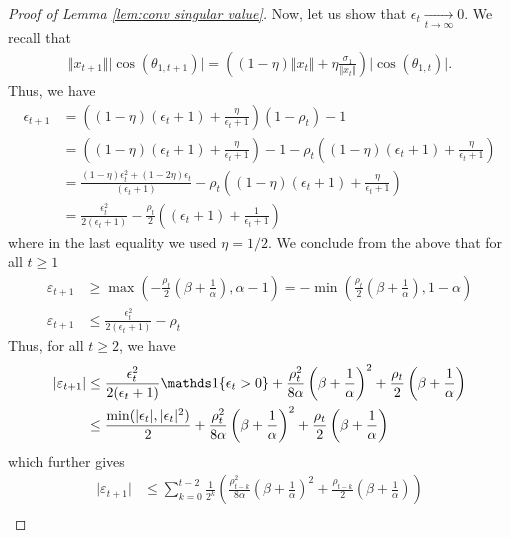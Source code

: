 \begin{proof}[Proof of Lemma \ref{lem:conv singular value}]
    \medskip 
    Now, let us show that $\epsilon_t \underset{t \to \infty}{\longrightarrow} 0$. We recall that  
    \begin{align}
        \Vert x_{t+1} \Vert \vert \cos(\theta_{1, t+1})\vert = \left((1-\eta)\Vert x_t \Vert + \eta \frac{\sigma_1}{\Vert x_t \Vert} \right) \vert \cos(\theta_{1, t})\vert.
    \end{align}
    Thus, we have 
    \begin{align}
        \epsilon_{t+1} & = \left( (1- \eta) (\epsilon_t + 1) + \frac{\eta}{\epsilon_t + 1}\right) (1 - \rho_t) - 1  \\
        & =  \left( (1- \eta) (\epsilon_t + 1) + \frac{\eta}{\epsilon_t + 1}\right) - 1 - \rho_t \left( (1- \eta) (\epsilon_t + 1) + \frac{\eta}{\epsilon_t + 1}\right) \\
        & = \frac{(1-\eta)\epsilon_t^2 + (1-2\eta)\epsilon_t }{(\epsilon_t + 1)} - \rho_t \left( (1- \eta) (\epsilon_t + 1) + \frac{\eta}{\epsilon_t + 1}\right) \\
        & = \frac{\epsilon_t^2}{2 (\epsilon_t + 1)} - \frac{\rho_t}{2} \left( (\epsilon_t + 1) + \frac{1}{\epsilon_t + 1}\right) 
    \end{align}
    where in the last equality we used  $\eta = 1/2$. We conclude from the above that for all $t \ge 1$
    \begin{align*}
        \varepsilon_{t+1} & \ge \max\left(- \frac{\rho_t}{2}\left(\beta + \frac{1}{\alpha}\right), \alpha - 1 \right) = - \min\left(\frac{\rho_t}{2}\left(\beta + \frac{1}{\alpha}\right), 1 - \alpha \right) \\
        \varepsilon_{t+1} & \le \frac{\epsilon_t^2}{2(\epsilon_t + 1)} - \rho_t 
    \end{align*}
    Thus, for all $t \ge 2$, we have 
    \begin{align*}
        \vert \varepsilon_{t+1} \vert  & \le \frac{\epsilon_t^2}{2(\epsilon_t + 1)} \indicator\lbrace \epsilon_t > 0\rbrace + \frac{\rho_t^2}{8\alpha} \left(\beta + \frac{1}{\alpha}\right)^2 + \frac{\rho_t}{2}\left(\beta + \frac{1}{\alpha}\right) \\
        & \le \frac{\min(\vert \epsilon_t \vert, \vert \epsilon_t \vert^2)}{2} + \frac{\rho_t^2}{8\alpha} \left(\beta + \frac{1}{\alpha}\right)^2 + \frac{\rho_t}{2}\left(\beta + \frac{1}{\alpha}\right)
    \end{align*}
    which further gives 
    \begin{align*}
        \vert \varepsilon_{t+1} \vert & \le \sum_{k = 0}^{t-2} \frac{1}{2^k} \left(  \frac{\rho_{t-k}^2}{8\alpha} \left(\beta + \frac{1}{\alpha}\right)^2 + \frac{\rho_{t-k}}{2}\left(\beta + \frac{1}{\alpha}\right)  \right) \\

\end{align*}
\end{proof}
